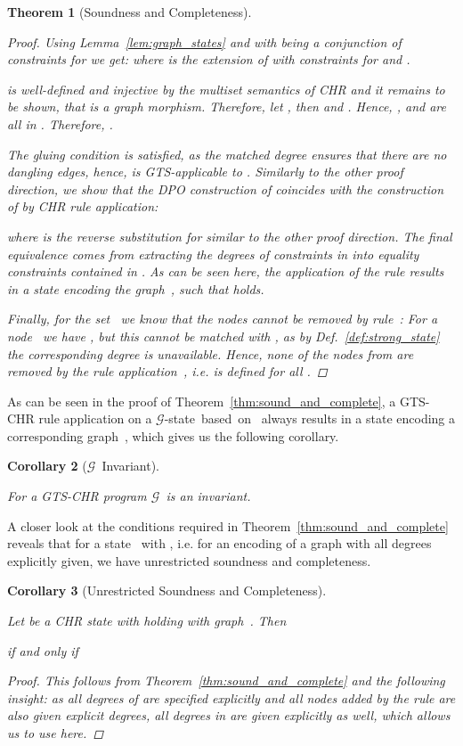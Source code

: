 \documentclass{tlp}
\newtheorem{theorem}{Theorem}\newtheorem{corollary}[theorem]{Corollary}
\newcommand{\mcG}{\ensuremath{\mathcal{G}}}
\begin{document}
\begin{theorem}[Soundness and Completeness]
\begin{proof}
Using Lemma~\ref{lem:graph_states} and with  being a conjunction of
 constraints for  we get: 
where  is the extension of  with  constraints
for  and .

 is well-defined and injective by the multiset semantics of
CHR and it remains to be shown, that  is a graph morphism. Therefore, let , then  and
. Hence, ,  and
 are all in . Therefore, .

The gluing condition is satisfied, as  the
matched degree ensures that there are no dangling edges, hence,  is
GTS-applicable to . Similarly to the other proof direction, we show that the
DPO construction of  coincides with the construction of  by CHR rule
application:

 where  is the reverse substitution for  similar to the other proof
direction. The final equivalence comes from extracting the degrees of constraints
in  into equality constraints contained in . As can be
seen here, the application of the rule results in a state encoding the graph~,
such that  holds.

Finally, for the set~ we know that the nodes cannot be removed
by rule~: For a node~ we have
, but this cannot be matched with
, as by Def.~\ref{def:strong_state} the corresponding degree is
unavailable. Hence, none of the nodes from  are removed by the
rule application~, i.e.  is defined for all .
\end{proof}
\end{theorem}

As can be seen in the proof of Theorem~\ref{thm:sound_and_complete}, a GTS-CHR
rule application on a \mcG-state~based~on~ always results in a state encoding
a corresponding graph~, which gives us the following corollary.

\begin{corollary}[\mcG\ Invariant]\label{cor:g_invariant}

For a GTS-CHR program \mcG\ is an invariant.
\end{corollary}

A closer look at the conditions required in Theorem~\ref{thm:sound_and_complete}
reveals that for a state~ with , i.e. for an
encoding of a graph with all degrees explicitly given, we have unrestricted
soundness and completeness.

\begin{corollary}[Unrestricted Soundness and Completeness]
\label{cor:sound_and_complete}

Let  be a CHR state with
 holding with graph~. Then 
\centerline{if and only if}

\begin{proof}
This follows from Theorem~\ref{thm:sound_and_complete} and the following
insight: as all degrees of  are specified explicitly and all nodes added by
the rule are also given explicit degrees, all degrees in  are given
explicitly as well, which allows us to use  here.
\end{proof}
\end{corollary}
\end{document}

